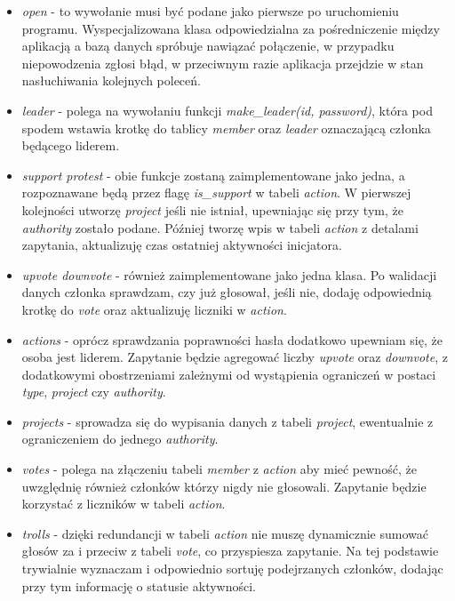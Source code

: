 \documentclass[12pt]{article}
\begin{document}
\begin{itemize}
	
	\item \textit{open} - to wywołanie musi być podane jako pierwsze po uruchomieniu programu. Wyspecjalizowana klasa odpowiedzialna za pośredniczenie między aplikacją a bazą danych spróbuje nawiązać połączenie, w przypadku niepowodzenia zgłosi błąd, w przeciwnym razie aplikacja przejdzie w stan nasłuchiwania kolejnych poleceń.

	\item \textit{leader} - polega na wywołaniu funkcji \textit{make\_leader(id, password)}, która pod spodem wstawia krotkę do tablicy \textit{member} oraz \textit{leader} oznaczającą członka będącego liderem.

	\item \textit{support protest} - obie funkcje zostaną zaimplementowane jako jedna, a rozpoznawane będą przez flagę \textit{is\_support} w tabeli \textit{action}. W pierwszej kolejności utworzę \textit{project} jeśli nie istniał, upewniając się przy tym, że \textit{authority} zostało podane. Później tworzę wpis w tabeli \textit{action} z detalami zapytania, aktualizuję czas ostatniej aktywności inicjatora.
	
	\item \textit{upvote downvote} - również zaimplementowane jako jedna klasa. Po walidacji danych członka sprawdzam, czy już głosował, jeśli nie, dodaję odpowiednią krotkę do \textit{vote} oraz aktualizuję liczniki w \textit{action}.

	\item \textit{actions} - oprócz sprawdzania poprawności hasła dodatkowo upewniam się, że osoba jest liderem. Zapytanie będzie agregować liczby \textit{upvote} oraz \textit{downvote}, z dodatkowymi obostrzeniami zależnymi od wystąpienia ograniczeń w postaci \textit{type}, \textit{project} czy \textit{authority}.

	\item \textit{projects} - sprowadza się do wypisania danych z tabeli \textit{project}, ewentualnie z ograniczeniem do jednego \textit{authority}.

	\item \textit{votes} - polega na złączeniu tabeli \textit{member} z \textit{action} aby mieć pewność, że uwzględnię również członków którzy nigdy nie głosowali. Zapytanie będzie korzystać z liczników w tabeli \textit{action}.

	\item \textit{trolls} - dzięki redundancji w tabeli \textit{action} nie muszę dynamicznie sumować głosów za i przeciw z tabeli \textit{vote}, co przyspiesza zapytanie. Na tej podstawie trywialnie wyznaczam i odpowiednio sortuję podejrzanych członków, dodając przy tym informację o statusie aktywności.

\end{itemize}
\end{document}
